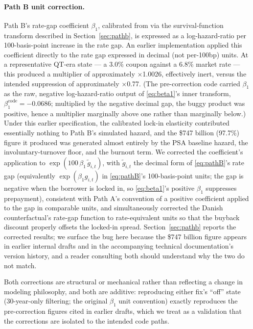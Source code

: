 \documentclass[12pt]{article}
\begin{document}
\paragraph{Path B unit correction.} Path B's rate-gap coefficient $\beta_1$, calibrated from \citet{liebersohn2024} via the survival-function transform described in Section~\ref{sec:pathb}, is expressed as a log-hazard-ratio per 100-basis-point increase in the rate gap. An earlier implementation applied this coefficient directly to the rate gap expressed in decimal (not per-100bp) units. At a representative QT-era state --- a 3.0\% coupon against a 6.8\% market rate --- this produced a multiplier of approximately $\times$1.0026, effectively inert, versus the intended suppression of approximately $\times$0.77. (The pre-correction code carried $\beta_1$ as the raw, negative log-hazard-ratio output of \eqref{eq:beta1}'s inner transform, $\beta_1^{\mathrm{code}} = -0.0686$; multiplied by the negative decimal gap, the buggy product was positive, hence a multiplier marginally above one rather than marginally below.) Under this earlier specification, the calibrated lock-in elasticity contributed essentially nothing to Path B's simulated hazard, and the \$747 billion (97.7\%) figure it produced was generated almost entirely by the PSA baseline hazard, the involuntary-turnover floor, and the burnout term. We corrected the coefficient's application to $\exp(100\,\beta_1\,\tilde g_{i,t})$, with $\tilde g_{i,t}$ the decimal form of \eqref{eq:pathB}'s rate gap (equivalently $\exp(\beta_1 g_{i,t})$ in \eqref{eq:pathB}'s 100-basis-point units; the gap is negative when the borrower is locked in, so \eqref{eq:beta1}'s positive $\beta_1$ suppresses prepayment), consistent with Path A's convention of a positive coefficient applied to the gap in comparable units, and simultaneously corrected the Danish counterfactual's rate-gap function to rate-equivalent units so that the buyback discount properly offsets the locked-in spread. Section~\ref{sec:pathb} reports the corrected results; we surface the bug here because the \$747 billion figure appears in earlier internal drafts and in the accompanying technical documentation's version history, and a reader consulting both should understand why the two do not match.

Both corrections are structural or mechanical rather than reflecting a change in modeling philosophy, and both are additive: reproducing either fix's ``off'' state (30-year-only filtering; the original $\beta_1$ unit convention) exactly reproduces the pre-correction figures cited in earlier drafts, which we treat as a validation that the corrections are isolated to the intended code paths.
\end{document}
